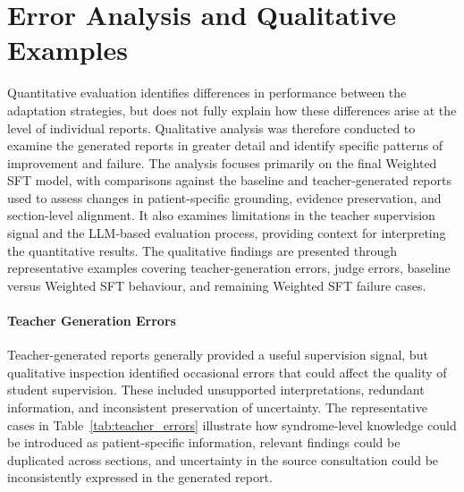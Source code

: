 \documentclass[ %
                    author={Aman Kumar Singh},
                supervisor={Dr. Edwin Simpson},
                    degree={MSc},
                     title={Quality-Aware Knowledge Distillation of Large Language Models for Efficient Personalised Clinical Report Generation},
                  subtitle={},
                      type={},
                      year={2021}]{dissertation}
\begin{document}
\section{Error Analysis and Qualitative Examples}
\label{sec:error_analysis}

Quantitative evaluation identifies differences in performance between the
adaptation strategies, but does not fully explain how these differences arise
at the level of individual reports. Qualitative analysis was therefore
conducted to examine the generated reports in greater detail and identify
specific patterns of improvement and failure. The analysis focuses primarily
on the final Weighted SFT model, with comparisons against the baseline and
teacher-generated reports used to assess changes in patient-specific
grounding, evidence preservation, and section-level alignment. It also
examines limitations in the teacher supervision signal and the LLM-based
evaluation process, providing context for interpreting the quantitative
results. The qualitative findings are presented through representative
examples covering teacher-generation errors, judge errors, baseline versus
Weighted SFT behaviour, and remaining Weighted SFT failure cases.
\paragraph{Teacher Generation Errors}

Teacher-generated reports generally provided a useful supervision signal, but
qualitative inspection identified occasional errors that could affect the
quality of student supervision. These included unsupported interpretations,
redundant information, and inconsistent preservation of uncertainty. The
representative cases in Table~\ref{tab:teacher_errors} illustrate how
syndrome-level knowledge could be introduced as patient-specific information,
relevant findings could be duplicated across sections, and uncertainty in the
source consultation could be inconsistently expressed in the generated report.
\end{document}
